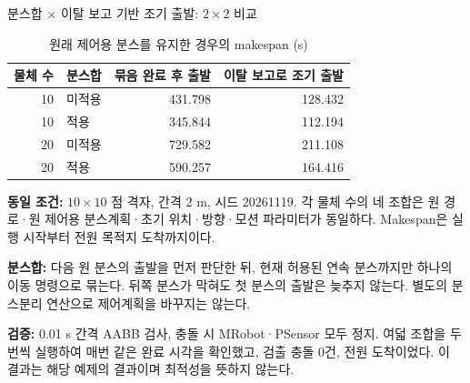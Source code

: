 \begin{frame}{분스합 $\times$ 이탈 보고 기반 조기 출발: $2\times2$ 비교}
\small
\begin{table}\centering
\caption{원래 제어용 분스를 유지한 경우의 makespan (s)}
\label{tab:merge-release-factorial}
\begin{tabular}{rlrr}
\hline
물체 수 & 분스합 & 묶음 완료 후 출발 & 이탈 보고로 조기 출발 \\
\hline
10 & 미적용 & 431.798 & 128.432 \\
10 & 적용 & 345.844 & 112.194 \\
\hline
20 & 미적용 & 729.582 & 211.108 \\
20 & 적용 & 590.257 & 164.416 \\
\hline
\end{tabular}\end{table}
\footnotesize
\textbf{동일 조건:} $10\times10$ 점 격자, 간격 2 m, 시드 20261119.
각 물체 수의 네 조합은 원 경로·원 제어용 분스계획·초기 위치·방향·모션 파라미터가
동일하다. Makespan은 실행 시작부터 전원 목적지 도착까지이다.
\par\medskip
\textbf{분스합:} 다음 원 분스의 출발을 먼저 판단한 뒤, 현재 허용된 연속 분스까지만
하나의 이동 명령으로 묶는다. 뒤쪽 분스가 막혀도 첫 분스의 출발은 늦추지 않는다.
별도의 분스분리 연산으로 제어계획을 바꾸지는 않는다.
\par\medskip
\textbf{검증:} 0.01 s 간격 AABB 검사, 충돌 시 MRobot·PSensor 모두 정지.
여덟 조합을 두 번씩 실행하여 매번 같은 완료 시각을 확인했고,
검출 충돌 0건, 전원 도착이었다. 이 결과는 해당 예제의 결과이며 최적성을 뜻하지 않는다.
\end{frame}



